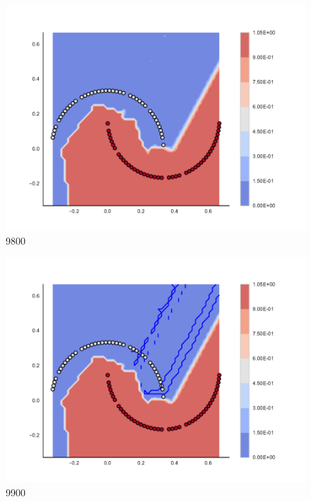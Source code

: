 \begin{subfigure}[b]{0.09\textwidth}
    \includegraphics[clip, trim=2.35cm 1.75cm 4.5cm 0cm,width=\textwidth]{img/convergence/9800.pdf}
    \caption{9800}
    \label{fig:convergence_9800}
\end{subfigure}
%
\begin{subfigure}[b]{0.09\textwidth}
    \includegraphics[clip, trim=2.35cm 1.75cm 4.5cm 0cm,width=\textwidth]{img/convergence/9900.pdf}
    \caption{9900}
    \label{fig:convergence_9900}
\end{subfigure}
%
